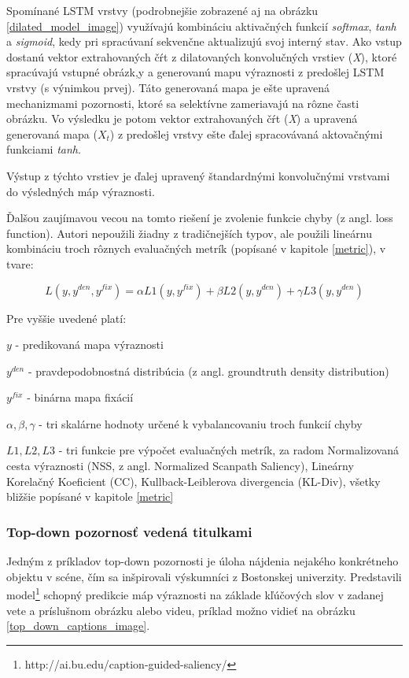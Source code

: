 Spomínané LSTM vrstvy (podrobnejšie zobrazené aj na obrázku \ref{dilated_model_image}) využívajú kombináciu aktivačných funkcií \textit{softmax}, \textit{tanh} a \textit{sigmoid}, kedy pri spracúvaní sekvenčne aktualizujú svoj interný stav. Ako vstup dostanú vektor extrahovaných čŕt z dilatovaných konvolučných vrstiev (\textit{X}), ktoré spracúvajú vstupné obrázk,y a generovanú mapu výraznosti z predošlej LSTM vrstvy (s výnimkou prvej). Táto generovaná mapa je ešte upravená mechanizmami pozornosti, ktoré sa selektívne zameriavajú na rôzne časti obrázku. Vo výsledku je potom vektor extrahovaných čŕt (\textit{X}) a upravená generovaná mapa (\textit{$X_t$}) z predošlej vrstvy ešte ďalej spracovávaná aktovačnými funkciami \textit{tanh}.

Výstup z týchto vrstiev je ďalej upravený štandardnými konvolučnými vrstvami do výsledných máp výraznosti.

Ďalšou zaujímavou vecou na tomto riešení je zvolenie funkcie chyby (z angl. loss function). Autori nepoužili žiadny z tradičnejších typov, ale použili lineárnu kombináciu troch rôznych evaluačných metrík (popísané v kapitole \ref{metric}), v tvare:

\begin{equation}
	L (y, y^{den}, y^{fix}) = \alpha L1(y, y^{fix}) + \beta L2(y, y^{den}) + \gamma L3(y, y^{den})
\end{equation}

Pre vyššie uvedené platí:

$y$ - predikovaná mapa výraznosti

$y^{den}$ - pravdepodobnostná distribúcia (z angl. groundtruth density distribution)

$y^{fix}$ - binárna mapa fixácií

$\alpha, \beta, \gamma $ - tri skalárne hodnoty určené k vybalancovaniu troch funkcií chyby

$L1, L2, L3$ - tri funkcie pre výpočet evaluačných metrík, za radom Normalizovaná cesta výraznosti (NSS, z angl. Normalized Scanpath Saliency), Lineárny Korelačný Koeficient (CC), Kullback-Leiblerova divergencia (KL-Div), všetky bližšie popísané v kapitole \ref{metric}

\subsubsection{Top-down pozornosť vedená titulkami}
\label{caption_model}
Jedným z príkladov top-down pozornosti je úloha nájdenia nejakého konkrétneho objektu v scéne, čím sa inšpirovali výskumníci z Bostonskej univerzity. Predstavili model\footnote{http://ai.bu.edu/caption-guided-saliency/} \cite{ramanishka2017top} schopný predikcie máp výraznosti na základe kľúčových slov v zadanej vete a príslušnom obrázku alebo videu, príklad možno vidieť na obrázku \ref{top_down_captions_image}.

